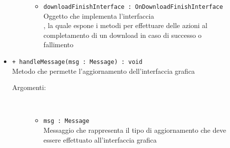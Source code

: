 \documentclass[../Tesi.tex]{subfiles}
\begin{document}
\begin{description}
\begin{itemize}
\begin{description}
\begin{itemize}
						\item \texttt{downloadFinishInterface : OnDownloadFinishInterface}\\
						Oggetto che implementa l'interfaccia \\, la quale espone i metodi per effettuare delle azioni al completamento di un download in caso di successo o fallimento
					\end{itemize}
				\end{description}

				\item \texttt{+ handleMessage(msg : Message) : void}\\
				Metodo che permette l'aggiornamento dell'interfaccia grafica
				\begin{description}
					\item[Argomenti:] \
					\begin{itemize}
						\item \texttt{msg : Message}\\
						Messaggio che rappresenta il tipo di aggiornamento che deve essere effettuato all'interfaccia grafica
					\end{itemize}
				\end{description}
			\end{itemize}
		\end{description}
\end{document}
